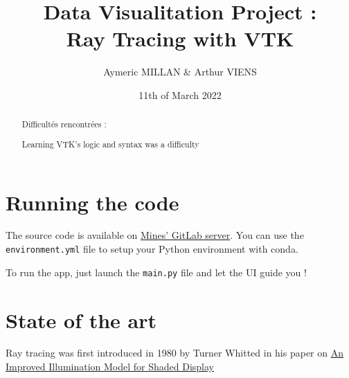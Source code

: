 \documentclass[10pt,twocolumn,letterpaper]{article}
\title{
		\huge Data Visualitation Project :\\ Ray Tracing with VTK \\
}
\author{Aymeric MILLAN \& Arthur VIENS}
\affil{Lecture given by Julien Wintz}
\date{11th of March 2022}
\def\code#1{\texttt{#1}}
\begin{document}
\setlength\headheight{26pt}

\maketitle

\thispagestyle{firstpage}
\begin{abstract}


Difficultés rencontrées :

Learning VTK's logic and syntax was a difficulty

\end{abstract}

\section{Running the code}
The source code is available on
\href{https://git.sophia.mines-paristech.fr/aymeric.millan/visu-raytracing}{Mines' GitLab server}.
You can use the \code{environment.yml} file to setup your Python environment
with conda.

To run the app, just launch the \code{main.py} file and let the UI guide you !

\section{State of the art}

    Ray tracing was first introduced in 1980 by Turner Whitted in his paper on
\href{https://www.cs.drexel.edu/~david/Classes/Papers/p343-whitted.pdf}{An
Improved Illumination Model for Shaded Display}


\end{document}
